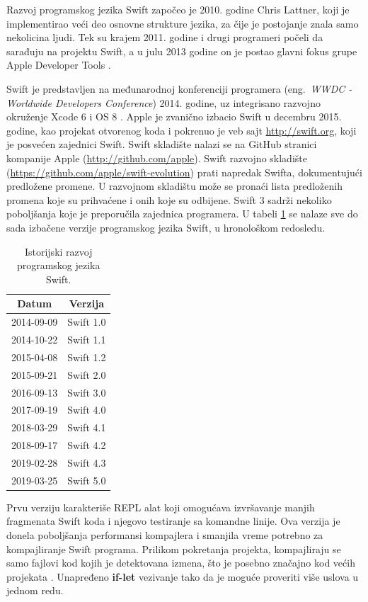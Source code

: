 \documentclass[a4paper]{article}
\begin{document}
Razvoj programskog jezika Swift započeo je 2010. godine Chris Lattner, koji je implementirao veći deo osnovne strukture jezika, za čije je postojanje znala samo nekolicina ljudi. Tek su krajem 2011. godine i drugi programeri počeli da sarađuju na projektu Swift, a u julu 2013 godine on je postao glavni fokus grupe Apple Developer Tools \cite{mastering_swift3}. 

Swift je predstavljen na međunarodnoj konferenciji programera (eng.~{\em WWDC - Worldwide Developers Conference}) 2014. godine, uz integrisano razvojno okruženje Xcode 6 i OS 8 \cite{thenextweb_sajt}. Apple je zvanično izbacio Swift u decembru 2015. godine, kao projekat otvorenog koda i pokrenuo je veb sajt \url{http://swift.org}, koji je posvećen zajednici Swift. Swift skladište nalazi  se na GitHub stranici kompanije Apple (\url{http://github.com/apple}). Swift razvojno skladište (\url{https://github.com/apple/swift-evolution}) prati napredak Swifta, dokumentujući predložene promene. U razvojnom skladištu može  se pronaći lista predloženih promena koje su prihvaćene i onih koje su odbijene. Swift 3 sadrži nekoliko poboljšanja koje je preporučila zajednica programera. U tabeli \ref{tab:tabela1} se nalaze sve do sada izbačene verzije programskog jezika Swift, u hronološkom redosledu.

\begin{table}[h!]
\begin{center}
\caption{Istorijski razvoj programskog jezika Swift.}
\begin{tabular}{|c|c|} \hline
\label{tab:tabela1}
Datum & Verzija \\ \hline
2014-09-09 & Swift 1.0 \\ \hline
2014-10-22 & Swift 1.1 \\ \hline
2015-04-08 & Swift 1.2 \\ \hline
2015-09-21 & Swift 2.0 \\ \hline
2016-09-13 & Swift 3.0 \\ \hline
2017-09-19 & Swift 4.0 \\ \hline
2018-03-29 & Swift 4.1 \\ \hline
2018-09-17 & Swift 4.2 \\ \hline
2019-02-28 & Swift 4.3 \\ \hline
2019-03-25 & Swift 5.0 \\ \hline
\end{tabular}
\end{center}
\end{table}

Prvu verziju karakteriše REPL alat koji omogućava izvršavanje  manjih fragmenata Swift koda i njegovo testiranje sa komandne linije. Ova verzija je donela poboljšanja performansi kompajlera i smanjila vreme potrebno za kompajliranje Swift programa. Prilikom pokretanja projekta, kompajliraju se samo fajlovi kod kojih je detektovana izmena, što je posebno značajno kod većih projekata \cite{swiftdev_sajt}. Unapređeno \textbf{if-let} vezivanje tako da je moguće proveriti više uslova u jednom redu.
\end{document}
